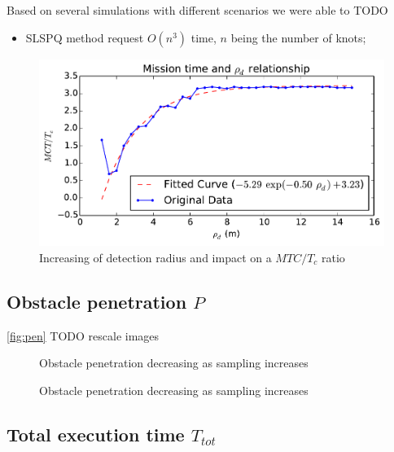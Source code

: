 \documentclass[eprint]{actapoly}
\begin{document}
Based on several simulations with different scenarios we were able to TODO

\begin{itemize}
 \item 
 SLSPQ method request $O(n^3)$ time, $n$ being the number of knots; 
\end{itemize}

\begin{figure}[!h]\centering
  \includegraphics[width=\linewidth]{./images/drho/drho-rmp.pdf} %
  \caption{Increasing of detection radius and impact on a $MTC/T_c$ 
ratio\label{fig:drho}}
\label{fig:res}
\end{figure}

\subsection{Obstacle penetration $P$}

\ref{fig:pen}
TODO rescale images

\begin{figure}[!h]\centering
  \caption{Obstacle penetration decreasing as sampling increases\label{fig:pen}}
\label{fig:res}
\end{figure}

\begin{figure}[!h]\centering
  \caption{Obstacle penetration decreasing as sampling increases\label{fig:pen}}
\label{fig:res}
\end{figure}

\subsection{Total execution time $T_{tot}$}
\end{document}
